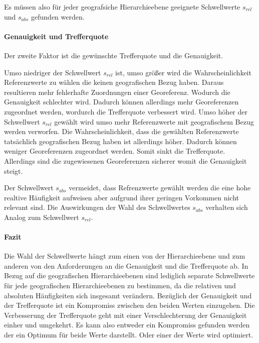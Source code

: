 					Es müssen also für jeder geografsiche Hierarchieebene geeignete Schwellwerte $s_{rel}$ und $s_{abs}$ gefunden werden.

				\paragraph{Genauigkeit und Trefferquote} 

					Der zweite Faktor ist die gewünschte Trefferquote und die Genauigkeit.

					Umso niedriger der Schwellwert $s_{rel}$ ist, umso größer wird die Wahrscheinlichkeit Referenzwerte zu wählen die keinen geografischen Bezug haben.
					Daraus resultieren mehr fehlerhafte Zuordnungen einer Georeferenz.
					Wodurch die Genauigkeit schlechter wird.
					Dadurch können allerdings mehr Georeferenzen zugeordnet werden, wordurch die Trefferquote verbessert wird.
					Umso höher der Schwellwert $s_{rel}$ gewählt wird umso mehr Referenzwerte mit geografischem Bezug werden verworfen.
					Die Wahrscheinlichkeit, dass die gewählten Referenzwerte tatsächlich geografischen Bezug haben ist allerdings höher.
					Dadurch können weniger Georeferenzen zugeordnet werden.
					Somit sinkt die Trefferquote.
					Allerdings sind die zugewiesenen Georeferenzen sicherer womit die Genauigkeit steigt.

					Der Schwellwert $s_{abs}$ vermeidet, dass Refrenzwerte gewählt werden die eine hohe realtive Häufigkeit aufweisen aber aufgrund ihrer geringen Vorkommen nicht relevant sind.
					Die Auswirkungen der Wahl des Schwellwertes $s_{abs}$ verhalten sich Analog zum Schwellwert $s_{rel}$.

				\paragraph{Fazit}

					Die Wahl der Schwellwerte hängt zum einen von der Hierarchieebene und zum anderen von den Anforderungen an die Genauigkeit und die Trefferquote ab.
					In Bezug auf die geografischen Hierarchieebenen sind lediglich separate Schwellwerte für jede geografischen Hierarchieebenen zu bestimmen, da die relativen und absoluten Häufigkeiten sich insgesamt verändern.
					Bezüglich der Genauigkeit und der Trefferquote ist ein Kompromiss zwischen den beiden Werten einzugehen. 
					Die Verbesserung der Trefferquote geht mit einer Verschlechterung der Genauigkeit einher und umgekehrt.
					Es kann also entweder ein Kompromiss gefunden werden der ein Optimum für beide Werte darstellt. 
					Oder einer der Werte wird optimiert. 
			
